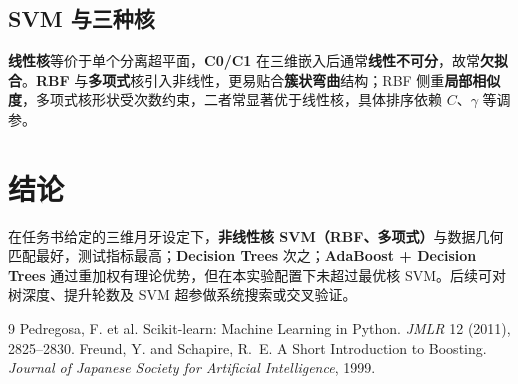 \documentclass[UTF8,a4paper,11pt]{ctexart}
\begin{document}
\subsection{SVM 与三种核}
\textbf{线性核}等价于单个分离超平面，\textbf{C0/C1} 在三维嵌入后通常\textbf{线性不可分}，故常\textbf{欠拟合}。\textbf{RBF} 与\textbf{多项式}核引入非线性，更易贴合\textbf{簇状弯曲}结构；RBF 侧重\textbf{局部相似度}，多项式核形状受次数约束，二者常显著优于线性核，具体排序依赖 $C$、$\gamma$ 等调参。

\section{结论}
在任务书给定的三维月牙设定下，\textbf{非线性核 SVM（RBF、多项式）}与数据几何匹配最好，测试指标最高；\textbf{Decision Trees} 次之；\textbf{AdaBoost + Decision Trees} 通过重加权有理论优势，但在本实验配置下未超过最优核 SVM。后续可对树深度、提升轮数及 SVM 超参做系统搜索或交叉验证。

\begin{thebibliography}{9}
  Pedregosa, F. et al.
  \newblock Scikit-learn: Machine Learning in Python.
  \newblock \emph{JMLR} 12 (2011), 2825--2830.
  Freund, Y. and Schapire, R.~E.
  \newblock A Short Introduction to Boosting.
  \newblock \emph{Journal of Japanese Society for Artificial Intelligence}, 1999.
\end{thebibliography}
\end{document}
